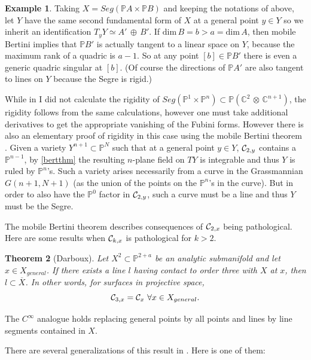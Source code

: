\documentclass[11pt]{amsart}
\newtheorem{theorem}{Theorem}[section]
\theoremstyle{definition}
\newtheorem{example}[theorem]{Example}
\theoremstyle{remark}
\numberwithin{equation}{section}
\def\BC{\mathbb C}\def\BF{\mathbb F}\def\BO{\mathbb O}\def\BS{\mathbb S}
\def\BP{\mathbb P}
\def\pp#1{\mathbb P^{#1}}
\def\pp#1{{\mathbb P}^{#1}}
\def\tdim{\rm dim}
\def\ot{{\mathord{\,\otimes }\,}}
\def\op{{\mathord{\,\oplus }\,}}
\def\tdim{\text{dim}\,}
\begin{document}
 \begin{example}\label{p1pnex} Taking $X=Seg(\BP A\times \BP B)$ and keeping the notations
 of above,
 let $Y$ have the same second fundamental form of $X$ at
 a general point $y\in Y$ so we inherit an identification
 $T_yY\simeq A'\op B'$. If $\tdim B=b>a=\tdim A$, then  mobile Bertini implies that $\BP B'$ is actually
 tangent to a linear space on $Y$, because the maximum rank
 of a quadric is $a-1$. So at any point $[b]\in  \BP B'$
there is even a generic quadric  
 singular at $[b]$. (Of course the directions
 of $\BP A'$ are also tangent to lines on $Y$ because   the Segre
 is rigid.) 
 
\smallskip
 
While in \cite{Lrigid} I did not calculate the rigidity of
$Seg(\pp 1\times \pp n)\subset\BP (\BC^2\ot\BC^{n+1})$,   the rigidity
follows from the same calculations, however one must take   additional
derivatives to get the appropriate vanishing of the Fubini forms. However
there is also an elementary proof of rigidity in this case using the
mobile Bertini theorem   \cite{Lchss}. Given a variety $Y^{n+1}\subset \pp N$ such that
at a general point $y\in Y$, ${\mathcal C}_{2,y}$ contains a $\pp{n-1}$, by
  \ref{bertthm} the resulting $n$-plane field
on $TY$ is integrable and thus $Y$ is
ruled by $\pp n$'s. Such a variety arises necessarily from a
curve in the Grassmannian $G(n+1,N+1)$ (as the union of the points on
the $\pp n$'s in the curve). But in order to also have the $\pp 0$ factor
in ${\mathcal C}_{2,y}$, such a curve must be a line and thus $Y$ must be
the Segre.


\end{example}


The mobile Bertini theorem describes consequences of ${\mathcal C}_{2,x}$ being pathological.
Here are some results when ${\mathcal C}_{k,x}$ is pathological for $k>2$.

\begin{theorem}[Darboux] Let $X^2\subset\pp{2+a}$ be an analytic submanifold
  and let $x\in X_{general}$. If there exists a line $l$
having contact to order three with $X$ at $x$, then $l\subset \overline X$. In other words,
for surfaces in projective space, 
$$
{\mathcal C}_{3,x}={\mathcal C}_x \ \forall x\in X_{general}.
$$
\end{theorem}

The $C^{\infty}$ analogue holds replacing general points by all points and
lines by line segments contained in $X$.

There are several  generalizations of this result in \cite{Lline,Lnfac}. Here is one of them:
\end{document}
